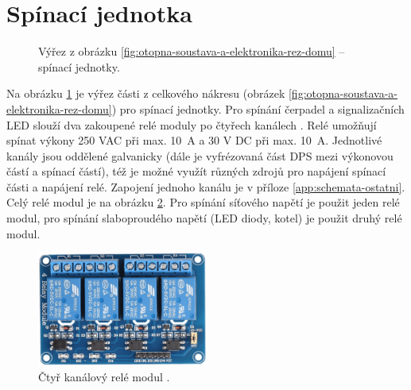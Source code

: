 \section{Spínací jednotka}
\begin{figure}[H]
   \centering
   \def\svgwidth{0.4\columnwidth}
   
    \caption[Výřez pro umístění spínacích jednotek.]{Výřez z obrázku \ref{fig:otopna-soustava-a-elektronika-rez-domu} – spínací jednotky.}
    \label{fig:vyrez-spinaci-jednotka}
\end{figure}
Na obrázku \ref{fig:vyrez-spinaci-jednotka} je výřez části z celkového nákresu (obrázek \ref{fig:otopna-soustava-a-elektronika-rez-domu}) pro spínací jednotky. Pro spínání čerpadel a signalizačních LED slouží dva zakoupené relé moduly po čtyřech kanálech \cite{rele-modul-informace}. Relé umožňují spínat výkony 250 VAC při max. 10~A a 30 V DC při max. 10~A. Jednotlivé kanály jsou oddělené galvanicky (dále je vyfrézovaná část DPS mezi výkonovou částí a spínací částí), též je možné využít různých zdrojů pro napájení spínací části a napájení relé. Zapojení jednoho kanálu je v příloze \ref{app:schemata-ostatni}. Celý relé modul je na obrázku \ref{fig:ctyr-kanalovy-rele-modul}. Pro spínání síťového napětí je použit jeden relé modul, pro spínání slaboproudého napětí (LED diody, kotel) je použit druhý relé modul.



\begin{figure}[H]
    \centering
    \includegraphics[width=0.5\textwidth]{images/ctyr-kanalovy-rele-modul.png}
    \caption[Čtyř kanálový relé modul.]{Čtyř kanálový relé modul \cite{ctyr-kanalovy-rele-modul}.}
    \label{fig:ctyr-kanalovy-rele-modul}
\end{figure}